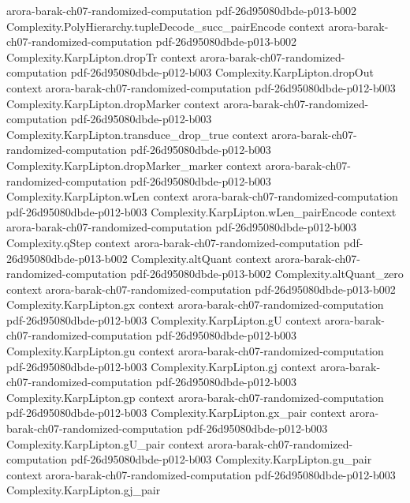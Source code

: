 \begin{theorem}
  {arora-barak-ch07-randomized-computation}
  {pdf-26d95080dbde-p013-b002}
\proofstep
  {Complexity.PolyHierarchy.tupleDecode_succ_pairEncode}
  {context}
  {arora-barak-ch07-randomized-computation}
  {pdf-26d95080dbde-p013-b002}
\proofstep
  {Complexity.KarpLipton.dropTr}
  {context}
  {arora-barak-ch07-randomized-computation}
  {pdf-26d95080dbde-p012-b003}
\proofstep
  {Complexity.KarpLipton.dropOut}
  {context}
  {arora-barak-ch07-randomized-computation}
  {pdf-26d95080dbde-p012-b003}
\proofstep
  {Complexity.KarpLipton.dropMarker}
  {context}
  {arora-barak-ch07-randomized-computation}
  {pdf-26d95080dbde-p012-b003}
\proofstep
  {Complexity.KarpLipton.transduce_drop_true}
  {context}
  {arora-barak-ch07-randomized-computation}
  {pdf-26d95080dbde-p012-b003}
\proofstep
  {Complexity.KarpLipton.dropMarker_marker}
  {context}
  {arora-barak-ch07-randomized-computation}
  {pdf-26d95080dbde-p012-b003}
\proofstep
  {Complexity.KarpLipton.wLen}
  {context}
  {arora-barak-ch07-randomized-computation}
  {pdf-26d95080dbde-p012-b003}
\proofstep
  {Complexity.KarpLipton.wLen_pairEncode}
  {context}
  {arora-barak-ch07-randomized-computation}
  {pdf-26d95080dbde-p012-b003}
\proofstep
  {Complexity.qStep}
  {context}
  {arora-barak-ch07-randomized-computation}
  {pdf-26d95080dbde-p013-b002}
\proofstep
  {Complexity.altQuant}
  {context}
  {arora-barak-ch07-randomized-computation}
  {pdf-26d95080dbde-p013-b002}
\proofstep
  {Complexity.altQuant_zero}
  {context}
  {arora-barak-ch07-randomized-computation}
  {pdf-26d95080dbde-p013-b002}
\proofstep
  {Complexity.KarpLipton.gx}
  {context}
  {arora-barak-ch07-randomized-computation}
  {pdf-26d95080dbde-p012-b003}
\proofstep
  {Complexity.KarpLipton.gU}
  {context}
  {arora-barak-ch07-randomized-computation}
  {pdf-26d95080dbde-p012-b003}
\proofstep
  {Complexity.KarpLipton.gu}
  {context}
  {arora-barak-ch07-randomized-computation}
  {pdf-26d95080dbde-p012-b003}
\proofstep
  {Complexity.KarpLipton.gj}
  {context}
  {arora-barak-ch07-randomized-computation}
  {pdf-26d95080dbde-p012-b003}
\proofstep
  {Complexity.KarpLipton.gp}
  {context}
  {arora-barak-ch07-randomized-computation}
  {pdf-26d95080dbde-p012-b003}
\proofstep
  {Complexity.KarpLipton.gx_pair}
  {context}
  {arora-barak-ch07-randomized-computation}
  {pdf-26d95080dbde-p012-b003}
\proofstep
  {Complexity.KarpLipton.gU_pair}
  {context}
  {arora-barak-ch07-randomized-computation}
  {pdf-26d95080dbde-p012-b003}
\proofstep
  {Complexity.KarpLipton.gu_pair}
  {context}
  {arora-barak-ch07-randomized-computation}
  {pdf-26d95080dbde-p012-b003}
\proofstep
  {Complexity.KarpLipton.gj_pair}

\end{theorem}
